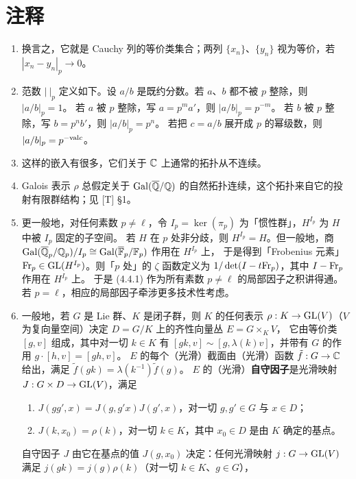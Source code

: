 \section*{注释}
\begingroup
\small
\begin{enumerate}[label=\arabic*., leftmargin=1.9em, itemsep=1.2pt, topsep=2pt]
\item 换言之，它就是 Cauchy 列的等价类集合；两列 $\{x_n\}$、$\{y_n\}$ 视为等价，若 $|x_n-y_n|_p\to0$。
\item 范数 $|\ |_p$ 定义如下。设 $a/b$ 是既约分数。若 $a$、$b$ 都不被 $p$ 整除，则 $|a/b|_p=1$。
若 $a$ 被 $p$ 整除，写 $a=p^ma'$，则 $|a/b|_p=p^{-m}$。
若 $b$ 被 $p$ 整除，写 $b=p^nb'$，则 $|a/b|_p=p^{n}$。
若把 $c=a/b$ 展开成 $p$ 的幂级数，则 $|a/b|_p=p^{-\mathrm{val} c}$。
\item 这样的嵌入有很多，它们关于 $\mathbb{C}$ 上通常的拓扑从不连续。
\item Galois 表示 $\rho$ 总假定关于 $\mathrm{Gal}(\overline{\mathbb{Q}}/\mathbb{Q})$ 的自然拓扑连续，这个拓扑来自它的投射有限群结构；见 [T] \S1。
\item 更一般地，对任何素数 $p\ne\ell$，令 $I_p=\ker(\pi_p)$ 为「惯性群」，$H^{I_p}$ 为 $H$ 中被 $I_p$ 固定的子空间。
若 $H$ 在 $p$ 处非分歧，则 $H^{I_p}=H$。但一般地，商 $\mathrm{Gal}(\overline{\mathbb{Q}}_p/\mathbb{Q}_p)/I_p\cong\mathrm{Gal}(\overline{\mathbb{F}}_p/\mathbb{F}_p)$ 作用在 $H^{I_p}$ 上，
于是得到「Frobenius 元素」$\mathrm{Fr}_p\in\mathrm{GL}(H^{I_p})$。则「$p$ 处」的 $\zeta$ 函数定义为 $1/\det(I-t\mathrm{Fr}_p)$，其中 $I-\mathrm{Fr}_p$ 作用在 $H^{I_p}$ 上。
于是 (4.4.1) 作为所有素数 $p\ne\ell$ 的局部因子之积讲得通。若 $p=\ell$，相应的局部因子牵涉更多技术性考虑。
\item 一般地，若 $G$ 是 Lie 群、$K$ 是闭子群，则 $K$ 的任何表示 $\rho:K\to\mathrm{GL}(V)$（$V$ 为复向量空间）决定 $D=G/K$ 上的齐性向量丛 $E=G\times_KV$，
它由等价类 $[g,v]$ 组成，其中对一切 $k\in K$ 有 $[gk,v]\sim[g,\lambda(k)v]$，并带有 $G$ 的作用 $g\cdot[h,v]=[gh,v]$。
$E$ 的每个（光滑）截面由（光滑）函数 $\tilde f:G\to\mathbb{C}$ 给出，满足 $\tilde f(gk)=\lambda(k^{-1})\tilde f(g)$。
$E$ 的（光滑）\textbf{自守因子}是光滑映射 $J:G\times D\to\mathrm{GL}(V)$，满足
\begin{enumerate}[label=(\arabic*), leftmargin=2.2em, topsep=1pt, itemsep=0pt]
\item $J(gg',x)=J(g,g'x)J(g',x)$，对一切 $g,g'\in G$ 与 $x\in D$；
\item $J(k,x_0)=\rho(k)$，对一切 $k\in K$，其中 $x_0\in D$ 是由 $K$ 确定的基点。
\end{enumerate}
自守因子 $J$ 由它在基点的值 $J(g,x_0)$ 决定：任何光滑映射 $j:G\to\mathrm{GL}(V)$ 满足 $j(gk)=j(g)\rho(k)$（对一切 $k\in K$、$g\in G$），

\end{enumerate}
